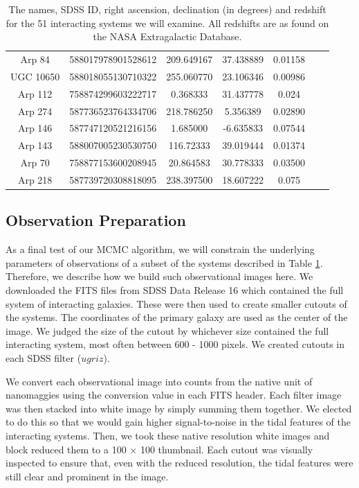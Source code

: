 \begin{table}
\begin{tabular}{|c|c|c|c|c|c|c|}
         Arp 84 & 588017978901528612 & 209.649167 & 37.438889 & 0.01158 \\
         UGC 10650 & 588018055130710322 & 255.060770 & 23.106346 & 0.00986 \\
         Arp 112 & 758874299603222717 & 0.368333 & 31.437778 & 0.024 \\
         Arp 274 & 587736523764334706 & 218.786250 & 5.356389 & 0.02890 \\
         Arp 146 & 587747120521216156 & 1.685000 & -6.635833 & 0.07544 \\
         Arp 143 & 588007005230530750 & 116.72333 & 39.019444 & 0.01374 \\
         Arp 70 & 758877153600208945 & 20.864583 & 30.778333 & 0.03500 \\
         Arp 218 & 587739720308818095 & 238.397500 & 18.607222 & 0.075 \\
         \hline
    \end{tabular}
    \caption{The names, SDSS ID, right ascension, declination (in degrees) and redshift for the 51 interacting systems we will examine. All redshifts are as found on the NASA Extragalactic Database.}
    \label{tab:Objects}
\end{table}

\subsection{Observation Preparation}\label{data:obs-prep}
\noindent As a final test of our MCMC algorithm, we will constrain the underlying parameters of observations of a subset of the systems described in Table \ref{tab:Objects}. Therefore, we describe how we build such observational images here. We downloaded the FITS files from SDSS Data Release 16 which contained the full system of interacting galaxies. These were then used to create smaller cutouts of the systems. The coordinates of the primary galaxy are used as the center of the image. We judged the size of the cutout by whichever size contained the full interacting system, most often between 600 - 1000 pixels. We created cutouts in each SDSS filter ($ugriz$).

We convert each observational image into counts from the native unit of nanomaggies using the conversion value in each FITS header. Each filter image was then stacked into white image by simply summing them together. We elected to do this so that we would gain higher signal-to-noise in the tidal features of the interacting systems. Then, we took these native resolution white images and block reduced them to a 100 $\times$ 100 thumbnail. Each cutout was visually inspected to ensure that, even with the reduced resolution, the tidal features were still clear and prominent in the image.

